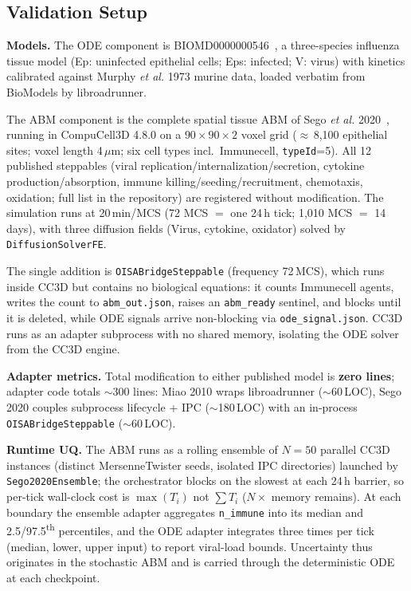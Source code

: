 \documentclass[conference,letterpaper,10pt]{IEEEtran}
\begin{document}
\subsection{Validation Setup}\label{sec:valid-setup}

\textbf{Models.} The ODE component is
BIOMD0000000546~\cite{miao2010influenza}, a three-species influenza tissue
model (Ep: uninfected epithelial cells; Eps: infected; V: virus) with
kinetics calibrated against Murphy \emph{et al.} 1973 murine data, loaded
verbatim from BioModels by libroadrunner.

The ABM component is the complete spatial tissue ABM of Sego \emph{et al.}
2020~\cite{sego2020modular}, running in CompuCell3D 4.8.0 on a
$90{\times}90{\times}2$ voxel grid ($\approx$\,8{,}100 epithelial sites;
voxel length 4\,$\mu$m; six cell types incl.\ Immunecell,
\texttt{typeId}=5). All 12 published steppables (viral
replication/internalization/secretion, cytokine production/absorption,
immune killing/seeding/recruitment, chemotaxis, oxidation; full list in the
repository) are registered without modification. The simulation runs at
20\,min/MCS (72 MCS $=$ one 24\,h tick; 1{,}010 MCS $=$ 14 days), with three
diffusion fields (Virus, cytokine, oxidator) solved by
\texttt{DiffusionSolverFE}.

The single addition is \texttt{OISABridgeSteppable} (frequency 72\,MCS),
which runs inside CC3D but contains no biological equations: it counts
Immunecell agents, writes the count to \texttt{abm\_out.json}, raises an
\texttt{abm\_ready} sentinel, and blocks until it is deleted, while ODE
signals arrive non-blocking via \texttt{ode\_signal.json}. CC3D runs as an
adapter subprocess with no shared memory, isolating the ODE solver from
the CC3D engine.

\textbf{Adapter metrics.} Total modification to either published model is
\textbf{zero lines}; adapter code totals $\sim$300 lines: Miao 2010 wraps
libroadrunner ($\sim$60\,LOC), Sego 2020 couples subprocess lifecycle + IPC
($\sim$180\,LOC) with an in-process \texttt{OISABridgeSteppable}
($\sim$60\,LOC).

\textbf{Runtime UQ.} The ABM runs as a rolling ensemble of $N\!=\!50$
parallel CC3D instances (distinct MersenneTwister seeds, isolated IPC
directories) launched by \texttt{Sego2020Ensemble}; the orchestrator
blocks on the slowest at each 24\,h barrier, so per-tick wall-clock cost
is $\max(T_i)$ not $\sum T_i$ ($N\times$ memory remains). At each boundary
the ensemble adapter aggregates \texttt{n\_immune} into its median and
2.5/97.5\textsuperscript{th} percentiles, and the ODE adapter integrates
three times per tick (median, lower, upper input) to report viral-load
bounds. Uncertainty thus originates in the stochastic ABM and is carried
through the deterministic ODE at each checkpoint.
\end{document}
